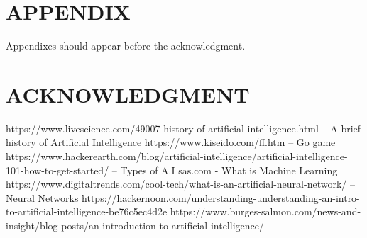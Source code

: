 \documentclass[letterpaper, 10 pt, conference]{ieeeconf}  %
\begin{document}
\addtolength{\textheight}{-12cm}   %

\section*{APPENDIX}

Appendixes should appear before the acknowledgment.

\section*{ACKNOWLEDGMENT}

\begin{thebibliography}{99}

 https://www.livescience.com/49007-history-of-artificial-intelligence.html -- A brief history of Artificial Intelligence
 https://www.kiseido.com/ff.htm -- Go game 
 https://www.hackerearth.com/blog/artificial-intelligence/artificial-intelligence-101-how-to-get-started/ -- Types of A.I
 sas.com - What is Machine Learning
 https://www.digitaltrends.com/cool-tech/what-is-an-artificial-neural-network/ -- Neural Networks
 https://hackernoon.com/understanding-understanding-an-intro-to-artificial-intelligence-be76c5ec4d2e
 https://www.burges-salmon.com/news-and-insight/blog-posts/an-introduction-to-artificial-intelligence/




\end{thebibliography}
\end{document}
